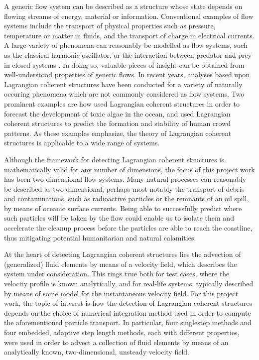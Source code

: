 A generic flow system can be described as a structure whose state depends on
flowing streams of energy, material or information. Conventional examples of
flow systems include the transport of physical properties such as pressure,
temperature or matter in fluids, and the transport of charge in electrical
currents. A large variety of phenomena can reasonably be modelled as flow
systems, such as the classical harmonic oscillator, or the interaction between
predator and prey in closed systems
\parencite[parts I--II]{strogatz2014nonlinear}. In doing so, valuable pieces
of insight can be obtained from well-understood properties of generic flows.
In recent years, analyses based upon Lagrangian coherent structures have been
conducted for a variety of naturally occuring phenomena which are not
commonly considered as flow systems. Two prominent examples are how
\textcite{olascoaga2008tracing} used Lagrangian coherent structures in order
to forecast the development of toxic algae in the ocean, and
\textcite{ali2007lagrangian} used Lagrangian coherent structures to predict
the formation and stability of human crowd patterns. As these examples
emphasize, the theory of Lagrangian coherent structures is applicable to a
wide range of systems.

Although the framework for detecting Lagrangian coherent structures is
mathematically valid for any number of dimensions, the focus of this project
work has been two-dimensional flow systems. Many natural processes can
reasonably be described as two-dimensional, perhaps most notably the transport
of debris and contaminations, such as radioactive particles or the remnants of
an oil spill, by means of oceanic surface currents. Being able to successfully
predict where such particles will be taken by the flow could enable us to
isolate them and accelerate the cleanup process before the particles are able
to reach the coastline, thus mitigating potential humanitarian and natural
calamities.

%
At the heart of detecting Lagrangian coherent structures lies the advection
of (generalized) fluid elements by means of a velocity field, which describes
the system under consideration. This rings true both for test cases, where the
velocity profile is known analytically, and for real-life systems, typically
described by means of some model for the instantaneous velocity field. For this
project work, the topic of interest is how the detection of Lagrangian coherent
structures depends on the choice of numerical integration method used in order
to compute the aforementioned particle transport. In particular, four singlestep
methods and four embedded, adaptive step length methods, each with different
properties, were used in order to advect a collection of fluid elements by means
of an analytically known, two-dimensional, unsteady velocity field.

